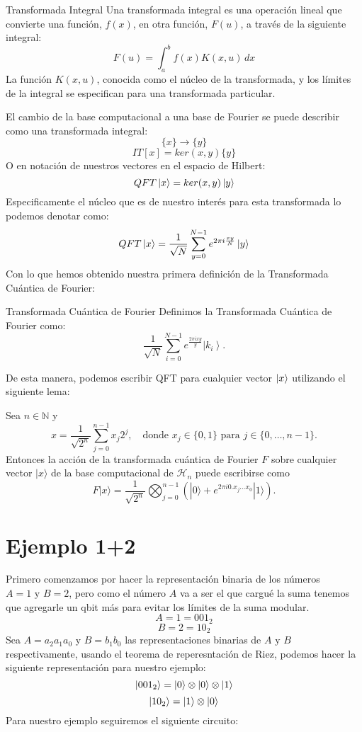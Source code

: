\documentclass{article}
\begin{document}
\begin{mydef}{Transformada Integral}{}
    Una transformada integral es una operación lineal que convierte una función, \(f(x)\), en otra función, \(F(u)\), a través de la siguiente integral:
\[ F(u) = \int_{a}^{b} f(x) K(x,u) \, dx \]
La función \(K(x,u)\), conocida como el núcleo de la transformada, y los límites de la integral se especifican para una transformada particular.
\end{mydef}
\noindent El cambio de la base computacional a una base de Fourier se puede describir
como una transformada integral:
\[\{x\}\to\{y\}\]
\[IT[x] = ker(x,y)\{y\}\]
O en notación de nuestros vectores en el espacio de Hilbert:
\[QFT\ket{x} = ker(x,y)\ket{y}\]
Especificamente el núcleo que es de nuestro interés para esta transformada lo podemos
denotar como:
\[QFT\ket{x}=\frac{1}{\sqrt{N}}\sum_{y=0}^{N-1}e^{2\pi i \frac{xy}{N}}\ket{y}\]
Con lo que hemos obtenido nuestra primera definición de la Transformada Cuántica de Fourier:
\begin{mydef}{Transformada Cuántica de Fourier}{}
    Definimos la Transformada Cuántica de Fourier como:
    \[\frac{1}{\sqrt{N}} \sum_{i=0}^{N-1} e^{\frac{2\pi i x y}{y}} \left| k_i \right\rangle.\]
\end{mydef}

De esta manera, podemos escribir QFT para cualquier vector \(\ket{x}\) utilizando el 
siguiente lema:
\begin{mylem}{}{}
    Sea $n \in \mathbb{N}$ y
    \[
    x = \frac{1}{\sqrt{2^n}} \sum_{j=0}^{n-1} x_j 2^j, \quad \text{donde } x_j \in \{0, 1\} \text{ para } j \in \{0, \ldots, n-1\}.
    \]
    Entonces la acción de la transformada cuántica de Fourier $F$ sobre cualquier vector $|x\rangle$ de la base computacional de $\mathcal{H}_n$ puede escribirse como
    \[
    F|x\rangle = \frac{1}{\sqrt{2^n}} \bigotimes_{j=0}^{n-1} \left( |0\rangle + e^{2\pi i 0.x_j \ldots x_0} |1\rangle \right).
    \]
\end{mylem}




\section{Ejemplo 1+2}
Primero comenzamos por hacer la representación binaria de los números
\(A = 1 \text{ y } B=2 \), pero como el número \(A\) va a ser el que cargué la suma
tenemos que agregarle un qbit más para evitar los límites de la suma modular.
\[A = 1 = 001_2\]
\[B=2=10_2\]
Sea \(A=a_{2}a_{1}a_{0}\) y \(B=b_1b_0\) las representaciones binarias de \(A \text{ y } B\)
respectivamente, usando el teorema de reperesntación de Riez, podemos hacer la siguiente representación
para nuestro ejemplo:
\[\ket{001_2}= \ket{0}\otimes\ket{0}\otimes\ket{1}\]
 \[\ket{10_2}=\ket{1}\otimes\ket{0}\]
Para nuestro ejemplo seguiremos el siguiente circuito:
\end{document}
